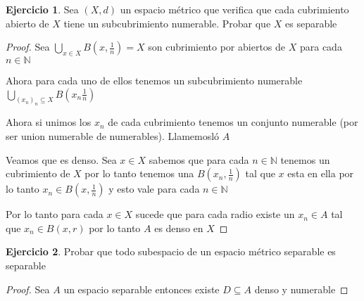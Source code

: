 \documentclass[12pt]{article}
\newcommand{\N}{\mathbb{N}}
\theoremstyle{definition}
\newtheorem{ej}{Ejercicio}
\begin{document}
\begin{ej}
  Sea $(X,d)$ un espacio métrico que verifica que cada cubrimiento abierto de $X$ tiene un subcubrimiento numerable. Probar que $X$ es separable
  \begin{proof}
    Sea $\bigcup_{x \in X} B(x,\frac{1}{n}) = X$ son cubrimiento por abiertos de $X$ para cada $n \in \N$

    Ahora para cada uno de ellos tenemos un subcubrimiento numerable $\bigcup_{(x_n)_n \subseteq X} B(x_n\frac{1}{n})$

    Ahora si unimos los $x_n$ de cada cubrimiento tenemos un conjunto numerable (por ser union numerable de numerables). Llamemosló $A$

    Veamos que es denso. Sea $x \in X$ sabemos que para cada $n \in \N$ tenemos un cubrimiento de $X$ por lo tanto tenemos una $B(x_n,\frac{1}{n})$ tal que $x$ esta en ella por lo tanto $x_n \in B(x,\frac{1}{n})$ y esto vale para cada $n \in \N$ 

    Por lo tanto para cada $x \in X$ sucede que para cada radio existe un $x_n \in A$ tal que $x_n \in B(x,r)$ por lo tanto $A$ es denso en $X$
  \end{proof}
\end{ej}
\begin{ej}
  Probar que todo subespacio de un espacio métrico separable es separable
  \begin{proof}
    Sea $A$ un espacio separable entonces existe $D \subseteq A$ denso y numerable
  \end{proof}
\end{ej}
\end{document}
